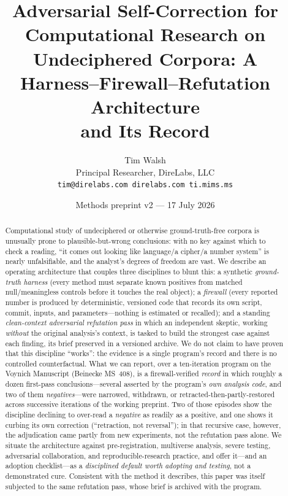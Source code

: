 \documentclass[11pt]{article}
\title{\textbf{Adversarial Self-Correction for Computational Research on\\
Undeciphered Corpora: A Harness--Firewall--Refutation Architecture\\ and Its Record}}
\author{Tim Walsh \\ \small Principal Researcher, DireLabs, LLC \\
\small \texttt{tim@direlabs.com \quad direlabs.com \quad ti.mims.ms}}
\date{Methods preprint v2 --- 17 July 2026}
\begin{document}
\maketitle

\begin{abstract}
\noindent Computational study of undeciphered or otherwise ground-truth-free corpora is
unusually prone to plausible-but-wrong conclusions: with no key against which to check a
reading, ``it comes out looking like language/a cipher/a number system'' is nearly
unfalsifiable, and the analyst's degrees of freedom are vast. We describe an operating
architecture that couples three disciplines to blunt this: a synthetic \emph{ground-truth
harness} (every method must separate known positives from matched null/meaningless controls
before it touches the real object); a \emph{firewall} (every reported number is produced by
deterministic, versioned code that records its own script, commit, inputs, and
parameters---nothing is estimated or recalled); and a standing \emph{clean-context
adversarial refutation pass} in which an independent skeptic, working \emph{without} the
original analysis's context, is tasked to build the strongest case against each finding, its
brief preserved in a versioned archive. We do not claim to have proven that this discipline
``works'': the evidence is a single program's record and there is no controlled
counterfactual. What we can report, over a ten-iteration program on the Voynich Manuscript
(Beinecke MS~408), is a firewall-verified \emph{record} in which roughly a dozen first-pass
conclusions---several asserted by the program's \emph{own analysis code}, and two of them
\emph{negatives}---were narrowed, withdrawn, or retracted-then-partly-restored across
successive iterations of the working preprint. Two of those episodes show the discipline
declining to over-read a \emph{negative} as readily as a positive, and one shows it curbing
its own correction (``retraction, not reversal''); in that recursive case, however, the
adjudication came partly from new experiments, not the refutation pass alone. We situate the
architecture against pre-registration, multiverse analysis, severe testing, adversarial
collaboration, and reproducible-research practice, and offer it---and an adoption
checklist---as a \emph{disciplined default worth adopting and testing}, not a demonstrated
cure. Consistent with the method it describes, this paper was itself subjected to the same
refutation pass, whose brief is archived with the program.
\end{abstract}
\end{document}
